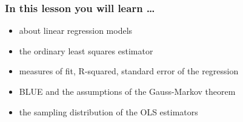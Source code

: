 

\begin{frame}
  \frametitle{In this lesson you will learn \dots}
  \begin{itemize}
  \item about linear regression models
  \item the ordinary least squares estimator
  \item measures of fit, R-squared, standard error of the regression
  \item BLUE and the assumptions of the Gauss-Markov theorem
  \item the sampling distribution of the OLS estimators
  \end{itemize}
\end{frame}

